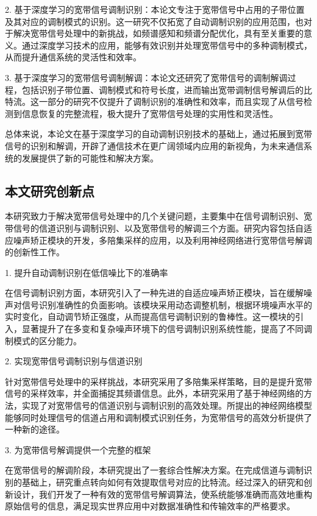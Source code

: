 2. 基于深度学习的宽带信号调制识别：本论文专注于宽带信号中占用的子带位置及其对应的调制模式的识别。这一研究不仅拓宽了自动调制识别的应用范围，也对于解决宽带信号处理中的新挑战，如频谱感知和频谱分配优化，具有至关重要的意义。通过深度学习技术的应用，能够有效识别并处理宽带信号中的多种调制模式，从而提升通信系统的灵活性和效率。

3. 基于深度学习的宽带信号调制解调：本论文还研究了宽带信号的调制解调过程，包括识别子带位置、调制模式和符号长度，进而输出宽带调制信号解调后的比特流。这一部分的研究不仅提升了调制识别的准确性和效率，而且实现了从信号检测到信息恢复的完整流程，极大提升了宽带信号处理的实用性和灵活性。

总体来说，本论文在基于深度学习的自动调制识别技术的基础上，通过拓展到宽带信号的识别和解调，开辟了通信技术在更广阔领域内应用的新视角，为未来通信系统的发展提供了新的可能性和解决方案。

\subsection{本文研究创新点}\label{sec:background}

本研究致力于解决宽带信号处理中的几个关键问题，主要集中在信号调制识别、宽带信号的信道识别与调制识别、以及宽带信号的解调三个方面。研究内容包括自适应噪声矫正模块的开发，多陪集采样的应用，以及利用神经网络进行宽带信号解调的创新性工作。

1. 提升自动调制识别在低信噪比下的准确率

在信号调制识别方面，本研究引入了一种先进的自适应噪声矫正模块，旨在缓解噪声对信号识别准确性的负面影响。该模块采用动态调整机制，根据环境噪声水平的实时变化，自动调节矫正强度，从而提高信号调制识别的鲁棒性。这一模块的引入，显著提升了在多变和复杂噪声环境下的信号调制识别系统性能，提高了不同调制模式的区分能力。

2. 实现宽带信号调制识别与信道识别

针对宽带信号处理中的采样挑战，本研究采用了多陪集采样策略，目的是提升宽带信号的采样效率，并全面捕捉其频谱信息。此外，本研究采用了基于神经网络的方法，实现了对宽带信号的信道识别与调制识别的高效处理。所提出的神经网络模型能够同时处理信号的信道占用和调制模式识别任务，为宽带信号的高效分析提供了一种新的途径。

3. 为宽带信号解调提供一个完整的框架

在宽带信号的解调阶段，本研究提出了一套综合性解决方案。在完成信道与调制识别的基础上，研究重点转向如何有效提取信号对应的比特流。经过深入的研究和创新设计，我们开发了一种有效的宽带信号解调算法，使系统能够准确而高效地重构原始信号的信息，满足现实世界应用中对数据准确性和传输效率的严格要求。

